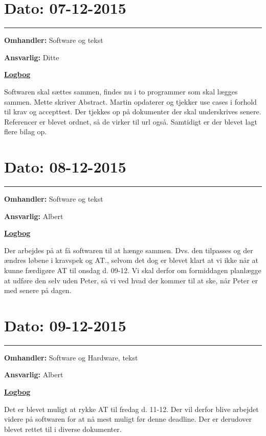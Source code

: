 \section{Dato: 07-12-2015}
\hrule
\textbf{Omhandler:} Software og tekst

\textbf{Ansvarlig:} Ditte 

\underline{\textbf{Logbog}}

Softwaren skal sættes sammen, findes nu i to programmer som skal lægges sammen. 
Mette skriver Abstract. 
Martin opdaterer og tjekker use cases i forhold til krav og accepttest. Der tjekkes op på dokumenter der skal underskrives senere. \\Referencer er blevet ordnet, så de virker til url også. Samtidigt er der blevet lagt flere bilag op.  
\\

\section{Dato: 08-12-2015}
\hrule
\textbf{Omhandler:} Software og tekst

\textbf{Ansvarlig:} Albert 

\underline{\textbf{Logbog}}

Der arbejdes på at få softwaren til at hænge sammen. Dvs. den tilpasses og der ændres løbene i kravspek og AT., selvom det dog er blevet klart at vi ikke når at kunne færdigøre AT til onsdag d. 09-12. Vi skal derfor om formiddagen planlægge at udføre den selv uden Peter, så vi ved hvad der kommer til at ske, når Peter er med senere på dagen.   
\\

\section{Dato: 09-12-2015}
\hrule
\textbf{Omhandler:} Software og Hardware, tekst

\textbf{Ansvarlig:} Albert 

\underline{\textbf{Logbog}}

Det er blevet muligt at rykke AT til fredag d. 11-12. Der vil derfor blive arbejdet videre på softwaren for at nå mest muligt før denne deadline. Der er derudover blevet rettet til i diverse dokumenter.
\\